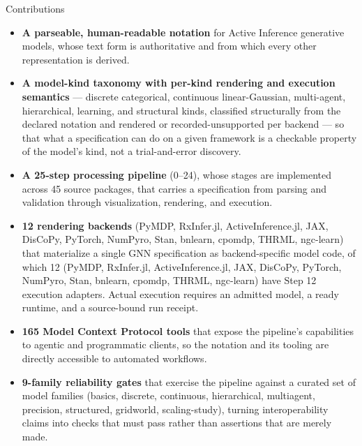 \documentclass[
  ignorenonframetext,
]{beamer}
\providecommand{\tightlist}{%
  \setlength{\itemsep}{0pt}\setlength{\parskip}{0pt}}
\begin{document}
\begin{frame}[allowframebreaks]{Contributions}
\begin{itemize}
\tightlist
\item
  \textbf{A parseable, human-readable notation} for Active Inference
  generative models, whose text form is authoritative and from which
  every other representation is derived.
\item
  \textbf{A model-kind taxonomy with per-kind rendering and execution
  semantics} --- discrete categorical, continuous linear-Gaussian,
  multi-agent, hierarchical, learning, and structural kinds, classified
  structurally from the declared notation and rendered or
  recorded-unsupported per backend --- so that what a specification can
  do on a given framework is a checkable property of the model's kind,
  not a trial-and-error discovery.
\item
  \textbf{A 25-step processing pipeline} (0--24), whose stages are
  implemented across 45 source packages, that carries a specification
  from parsing and validation through visualization, rendering, and
  execution.
\item
  \textbf{12 rendering backends} (PyMDP, RxInfer.jl, ActiveInference.jl,
  JAX, DisCoPy, PyTorch, NumPyro, Stan, bnlearn, cpomdp, THRML,
  ngc-learn) that materialize a single GNN specification as
  backend-specific model code, of which 12 (PyMDP, RxInfer.jl,
  ActiveInference.jl, JAX, DisCoPy, PyTorch, NumPyro, Stan, bnlearn,
  cpomdp, THRML, ngc-learn) have Step 12 execution adapters. Actual
  execution requires an admitted model, a ready runtime, and a
  source-bound run receipt.
\item
  \textbf{165 Model Context Protocol tools} that expose the pipeline's
  capabilities to agentic and programmatic clients, so the notation and
  its tooling are directly accessible to automated workflows.
\item
  \textbf{9-family reliability gates} that exercise the pipeline against
  a curated set of model families (basics, discrete, continuous,
  hierarchical, multiagent, precision, structured, gridworld,
  scaling-study), turning interoperability claims into checks that must
  pass rather than assertions that are merely made.
\end{itemize}
\end{frame}
\end{document}
